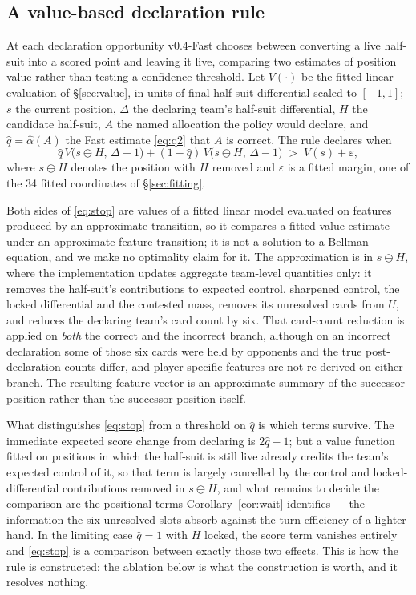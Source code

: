 \documentclass[11pt]{article}
\theoremstyle{definition}
\DeclareRobustCommand{\vfast}{\texorpdfstring{\mbox{v0.4-Fast}}{v0.4-Fast}}
\newcommand{\numParams}{34}
\begin{document}
\subsection{A value-based declaration rule}
\label{sec:stopping}

At each declaration opportunity \vfast{} chooses between converting a live
half-suit into a scored point and leaving it live, comparing two estimates of
position value rather than testing a confidence threshold. Let $V(\cdot)$ be the
fitted linear evaluation of \S\ref{sec:value}, in units of final half-suit
differential scaled to $[-1,1]$; $s$ the current position, $\Delta$ the declaring
team's half-suit differential, $H$ the candidate half-suit, $A$ the named
allocation the policy would declare, and $\hat q = \hat\alpha(A)$ the Fast
estimate \eqref{eq:q2} that $A$ is correct. The rule declares when
\begin{equation}
  \hat q\, V\bigl(s \ominus H,\, \Delta{+}1\bigr)
  + (1 - \hat q)\, V\bigl(s \ominus H,\, \Delta{-}1\bigr)
  \;>\; V(s) + \varepsilon,
  \label{eq:stop}
\end{equation}
where $s \ominus H$ denotes the position with $H$ removed and $\varepsilon$ is a
fitted margin, one of the \numParams{} fitted coordinates of \S\ref{sec:fitting}.

Both sides of \eqref{eq:stop} are values of a fitted linear model evaluated on
features produced by an approximate transition, so it compares a fitted value
estimate under an approximate feature transition; it is not a solution to a
Bellman equation, and we make no optimality claim for it. The approximation is in
$s \ominus H$, where the implementation updates aggregate team-level quantities
only: it removes the half-suit's contributions to expected control, sharpened
control, the locked differential and the contested mass, removes its unresolved
cards from $U$, and reduces the declaring team's card count by six. That
card-count reduction is applied on \emph{both} the correct and the incorrect
branch, although on an incorrect declaration some of those six cards were held by
opponents and the true post-declaration counts differ, and player-specific
features are not re-derived on either branch. The resulting feature vector is an
approximate summary of the successor position rather than the successor position
itself.

What distinguishes \eqref{eq:stop} from a threshold on $\hat q$ is which terms
survive. The immediate expected score change from declaring is $2\hat q - 1$; but
a value function fitted on positions in which the half-suit is still live already
credits the team's expected control of it, so that term is largely cancelled by
the control and locked-differential contributions removed in $s \ominus H$, and
what remains to decide the comparison are the positional terms
Corollary~\ref{cor:wait} identifies --- the information the six unresolved slots
absorb against the turn efficiency of a lighter hand. In the limiting case
$\hat q = 1$ with $H$ locked, the score term vanishes entirely and
\eqref{eq:stop} is a comparison between exactly those two effects. This is how
the rule is constructed; the ablation below is what the construction is worth,
and it resolves nothing.
\end{document}
